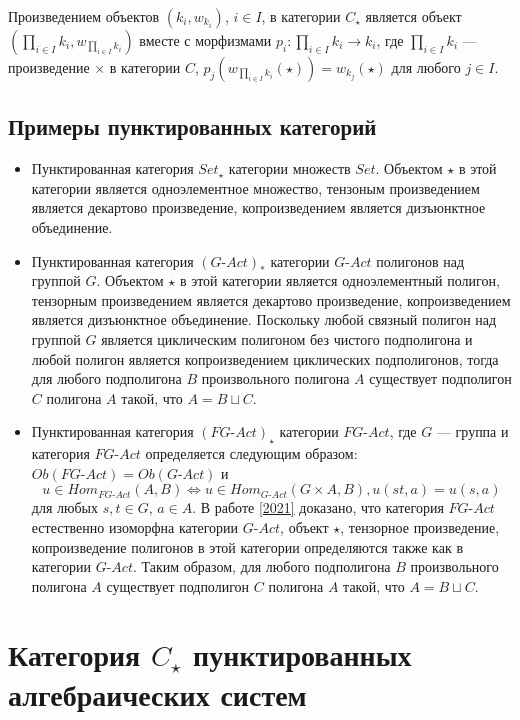 \documentclass[a4paper,12pt]{article}
\newcommand{\GAct}{G\text{-}Act}
\newcommand{\FGAct}{FG\text{-}Act}
\begin{document}
Произведением объектов $(k_i,w_{k_i})$, $i \in I$, в категории $C_\star$ является объект $(\prod_{i \in I} k_i,w_{\prod_{i \in I} k_i})$ вместе с морфизмами $p_i: \prod_{i \in I} k_i \to k_i$, где $\prod_{i \in I} k_i$ --- произведение $\times$ в категории $C$, $p_j(w_{\prod_{i \in I} k_i}(\star)) = w_{k_j}(\star)$ для любого $j \in I$.


\subsection{Примеры пунктированных категорий}
\begin{itemize}
    \item Пунктированная категория $Set_\star$ категории множеств $Set$. Объектом $\star$ в этой категории является одноэлементное множество, тензоным произведением является декартово произведение, копроизведением является дизъюнктное объединение.
    \item Пунктированная категория $(\GAct)_*$ категории $\GAct$ полигонов над группой $G$. Объектом $\star$ в этой категории является одноэлементный полигон, тензорным произведением является декартово произведение, копроизведением является дизъюнктное объединение. Поскольку любой связный полигон над группой $G$ является циклическим полигоном без чистого подполигона и любой полигон является копроизведением циклических подполигонов, тогда для любого подполигона $B$ произвольного полигона $A$ существует подполигон $C$ полигона $A$ такой, что $A = B \sqcup C$.
    \item Пунктированная категория $(\FGAct)_\star$ категории $\FGAct$, где $G$ --- группа и категория $\FGAct$ определяется следующим образом: $Ob(\FGAct) = Ob(\GAct)$ и
    $$
    u \in Hom_{\FGAct}(A,B) \Leftrightarrow u \in Hom_{\GAct}(G \times A, B), u(st,a) = u(s,a)
    $$
    для любых $s,t \in G$, $a \in A$. В работе \ref{2021} доказано, что категория $\FGAct$ естественно изоморфна категории $\GAct$, объект $\star$, тензорное произведение, копроизведение полигонов в этой категории определяются также как в категории $\GAct$. Таким образом, для любого подполигона $B$ произвольного полигона $A$ существует подполигон $C$ полигона $A$ такой, что $A = B \sqcup C$.
\end{itemize}

\section{Категория $C_\star$ пунктированных алгебраических систем}
\end{document}
